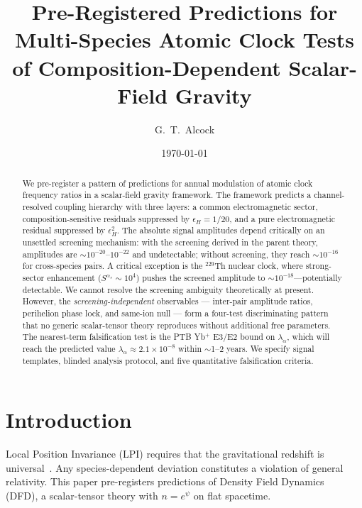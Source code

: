 \documentclass[aps,prd,twocolumn,superscriptaddress,floatfix]{revtex4-2}
\begin{document}
\title{Pre-Registered Predictions for Multi-Species Atomic Clock Tests\\
of Composition-Dependent Scalar-Field Gravity}
\author{G.~T.~Alcock}
\date{\today}
\begin{abstract}
We pre-register a pattern of predictions for annual modulation of
atomic clock frequency ratios in a scalar-field gravity framework.
The framework predicts a channel-resolved coupling hierarchy with
three layers: a common electromagnetic sector, composition-sensitive
residuals suppressed by $\epsilon_H = 1/20$, and a pure
electromagnetic residual suppressed by $\epsilon_H^2$. The absolute
signal amplitudes depend critically on an unsettled screening
mechanism: with the screening derived in the parent
theory, amplitudes are $\sim\!10^{-20}$--$10^{-22}$ and
undetectable; without screening, they reach $\sim\!10^{-16}$ for
cross-species pairs. A critical exception is the $^{229}$Th nuclear
clock, where strong-sector enhancement ($S^{\alpha_s} \sim 10^4$)
pushes the screened amplitude to $\sim\!10^{-18}$---potentially
detectable. We cannot resolve the screening ambiguity theoretically
at present. However, the \textit{screening-independent} observables
--- inter-pair amplitude ratios, perihelion phase lock, and
same-ion null --- form a four-test discriminating pattern that
no generic scalar-tensor theory reproduces without additional free
parameters. The nearest-term falsification test is the PTB Yb$^+$
E3/E2 bound on $\lambda_\alpha$, which will reach the predicted
value $\lambda_\alpha \approx 2.1 \times 10^{-8}$ within
$\sim$1--2 years. We specify signal templates, blinded analysis
protocol, and five quantitative falsification criteria.
\end{abstract}
\maketitle
\section{Introduction}
Local Position Invariance (LPI) requires that the gravitational
redshift is universal~\cite{Will2014}. Any species-dependent
deviation constitutes a violation of general relativity. This
paper pre-registers predictions of Density Field
Dynamics~\cite{Alcock2026DFD} (DFD), a scalar-tensor theory with
$n = e^\psi$ on flat spacetime.
\end{document}
